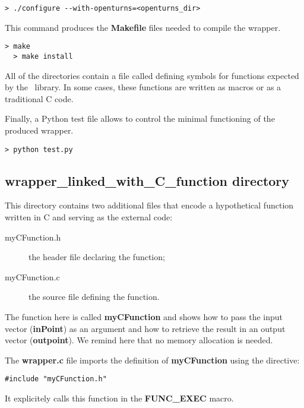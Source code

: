 \lstset{language=Bash, basicstyle=\normalsize}
\begin{lstlisting}[frame=TBRL]
  > ./configure --with-openturns=<openturns_dir>
\end{lstlisting}

This command produces the {\bf Makefile} files needed to compile the wrapper.
\lstset{language=Bash, basicstyle=\normalsize}
\begin{lstlisting}[frame=TBRL]
  > make
  > make install
\end{lstlisting}

All of the directories contain a file called  defining symbols for functions expected by the \OT\ library. In some cases, these functions are written as macros or as a traditional C code.

Finally, a Python test file allows to control the minimal functioning of the produced wrapper.

\lstset{language=Bash, basicstyle=\normalsize}
\begin{lstlisting}[frame=TBRL]
  > python test.py
\end{lstlisting}

\subsection{wrapper\_linked\_with\_C\_function directory}

This directory contains two additional files that encode a hypothetical function written in C and serving as the external code:
\begin{description}
\item[myCFunction.h] the header file declaring the function;
\item[myCFunction.c] the source file defining the function.
\end{description}

The function here is called {\bf myCFunction} and shows how to pass the input vector ({\bf inPoint}) as an argument and how to retrieve the result in an output vector ({\bf outpoint}). We remind here that no memory allocation is needed.

The {\bf wrapper.c} file imports the definition of {\bf myCFunction} using the directive:
\lstset{language=C++, basicstyle=\normalsize}
\begin{lstlisting}[frame=TBRL]
  #include "myCFunction.h"
\end{lstlisting}
It explicitely calls this function in the {\bf FUNC\_EXEC} macro.

